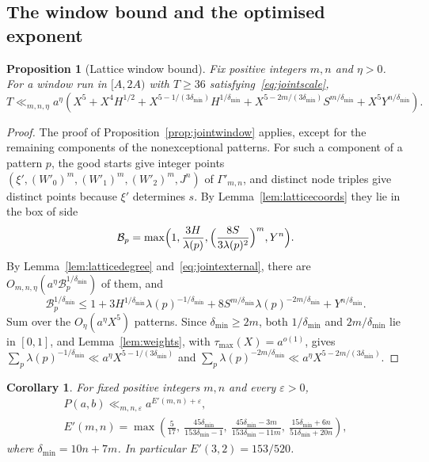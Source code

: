 \documentclass[11pt]{article}
\newtheorem{proposition}[theorem]{Proposition}
\newtheorem{corollary}[theorem]{Corollary}
\theoremstyle{definition}
\theoremstyle{remark}
\begin{document}
\subsection{The window bound and the optimised exponent}\label{sec:latticecount}

\begin{proposition}[Lattice window bound]\label{prop:latticewindow}
Fix positive integers $m,n$ and $\eta>0$. For a window run in $[A,2A)$ with $T\ge36$
satisfying~\eqref{eq:jointscale},
\[
 T\ll_{m,n,\eta}a^\eta\left(X^5+X^4H^{1/2}+X^{5-1/(3\delta_{\min})}H^{1/\delta_{\min}}
 +X^{5-2m/(3\delta_{\min})}S^{m/\delta_{\min}}+X^5Y^{n/\delta_{\min}}\right).
\]
\end{proposition}

\begin{proof}
The proof of Proposition~\ref{prop:jointwindow} applies, except for the remaining components of
the nonexceptional patterns. For such a component of a pattern $p$, the good starts give
integer points $(\xi',(W'_0)^m,(W'_1)^m,(W'_2)^m,J^n)$ of $\Gamma'_{m,n}$, and distinct node triples
give distinct points because $\xi'$ determines $s$. By Lemma~\ref{lem:latticecoords} they lie
in the box of side
\[
 \mathcal B_p=\max\Bigl(1,\frac{3H}{\lambda(p)},\Bigl(\frac{8S}{3\lambda(p)^2}\Bigr)^m,Y^n\Bigr).
\]
By Lemma~\ref{lem:latticedegree} and~\eqref{eq:jointexternal}, there are
$O_{m,n,\eta}(a^\eta\mathcal B_p^{1/\delta_{\min}})$ of them, and
\[
 \mathcal B_p^{1/\delta_{\min}}\le1+3H^{1/\delta_{\min}}\lambda(p)^{-1/\delta_{\min}}+8S^{m/\delta_{\min}}\lambda(p)^{-2m/\delta_{\min}}+Y^{n/\delta_{\min}}.
\]
Sum over the $O_\eta(a^\eta X^5)$ patterns. Since $\delta_{\min}\ge2m$, both $1/\delta_{\min}$ and $2m/\delta_{\min}$ lie in
$[0,1]$, and Lemma~\ref{lem:weights}, with $\tau_{\max}(X)=a^{o(1)}$, gives
$\sum_p\lambda(p)^{-1/\delta_{\min}}\ll a^\eta X^{5-1/(3\delta_{\min})}$ and
$\sum_p\lambda(p)^{-2m/\delta_{\min}}\ll a^\eta X^{5-2m/(3\delta_{\min})}$.
\end{proof}

\begin{corollary}\label{cor:latticeexponent}
For fixed positive integers $m,n$ and every $\varepsilon>0$,
\begin{gather*}
 P(a,b)\ll_{m,n,\varepsilon}a^{E'(m,n)+\varepsilon},\\
 E'(m,n)=\max\left(\frac5{17},\ \frac{45\delta_{\min}}{153\delta_{\min}-1},\ \frac{45\delta_{\min}-3m}{153\delta_{\min}-11m},\
 \frac{15\delta_{\min}+6n}{51\delta_{\min}+20n}\right),
\end{gather*}
where $\delta_{\min}=10n+7m$. In particular $E'(3,2)=153/520$.
\end{corollary}
\end{document}
